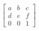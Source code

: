\documentclass[preview]{standalone}
\begin{document}
\begin{align*}
\begin{bmatrix} a & b & c \\ d & e & f \\ 0 & 0 & 1 \end{bmatrix}
\end{align*}
\end{document}
